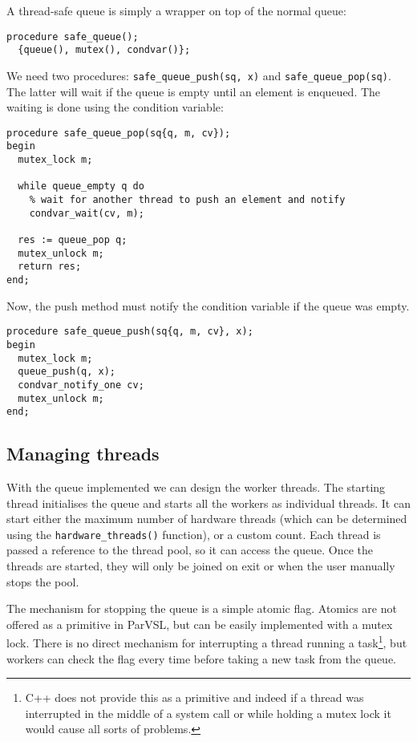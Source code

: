 A thread-safe queue is simply a wrapper on top of the normal queue:
\begin{verbatim}
procedure safe_queue();
  {queue(), mutex(), condvar()};
\end{verbatim}

We need two procedures: \verb|safe_queue_push(sq, x)| and \verb|safe_queue_pop(sq)|. The latter will
wait if the queue is empty until an element is enqueued. The waiting is done using the condition variable:

\begin{verbatim}
procedure safe_queue_pop(sq{q, m, cv});
begin
  mutex_lock m;

  while queue_empty q do
    % wait for another thread to push an element and notify
    condvar_wait(cv, m);

  res := queue_pop q;
  mutex_unlock m;
  return res;
end;
\end{verbatim}

Now, the push method must notify the condition variable if the queue was empty.
\begin{verbatim}
procedure safe_queue_push(sq{q, m, cv}, x);
begin
  mutex_lock m;
  queue_push(q, x);
  condvar_notify_one cv;
  mutex_unlock m;
end;
\end{verbatim}


\subsection{Managing threads}
\label{ssec:managethreads}

With the queue implemented we can design the worker threads. The starting thread
initialises the queue and starts all the workers as individual threads. It can start
either the maximum number of hardware threads (which can be determined using the
\texttt{hardware\_threads()} function), or a custom count. Each thread is passed a reference to
the thread pool, so it can access the queue. Once the threads are started, they will only
be joined on exit or when the user manually stops the pool.

The mechanism for stopping the queue is a simple atomic flag. Atomics are not offered as
a primitive in ParVSL, but can be easily implemented with a mutex lock. There is no direct
mechanism for interrupting a thread running a task\footnote{C++ does not provide this as a
primitive and indeed if a thread was interrupted in the middle of a system call or while
holding a mutex lock it would cause all sorts of problems.}, but workers can check the flag
every time before taking a new task from the queue.

